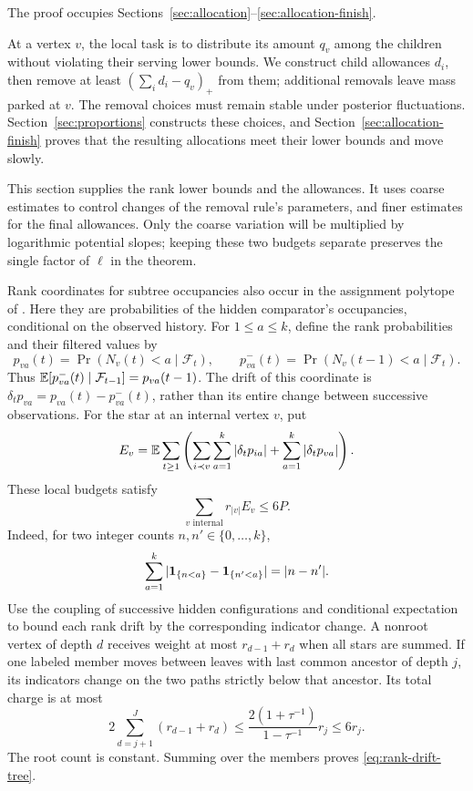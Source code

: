 The proof occupies Sections~\ref{sec:allocation}--\ref{sec:allocation-finish}.

At a vertex $v$, the local task is to distribute its amount $q_v$ among
the children without violating their serving lower bounds.  We construct
child allowances $d_i$, then remove at least $(\sum_i d_i-q_v)_+$ from
them; additional removals leave mass parked at $v$.  The removal choices
must remain stable under posterior fluctuations.  Section~\ref{sec:proportions}
constructs these choices, and Section~\ref{sec:allocation-finish} proves
that the resulting allocations meet their lower bounds and move slowly.

This section supplies the rank lower bounds and the allowances.  It uses
coarse estimates to control changes of the removal rule's parameters,
and finer estimates for the final allowances.  Only the coarse variation
will be multiplied by logarithmic potential slopes; keeping these two
budgets separate preserves the single factor of $\ell$ in the theorem.

Rank coordinates for subtree occupancies also occur in the assignment
polytope of \cite[Section~3.2]{BCLLM18}. Here they are probabilities of
the hidden comparator's occupancies, conditional on the observed history.
For $1\le a\le k$, define the rank probabilities and their filtered values by
\[
 p_{va}(t)=\Pr(N_v(t)<a\mid\mathcal F_t),\qquad
 p^-_{va}(t)=\Pr(N_v(t-1)<a\mid\mathcal F_t).
\]
Thus $\mathbb E[p^-_{va}(t)\mid\mathcal F_{t-1}]=p_{va}(t-1)$.
The drift of this coordinate is
$\delta_t p_{va}=p_{va}(t)-p^-_{va}(t)$, rather than its entire change
between successive observations.  For the star at an internal vertex $v$,
put
\begin{equation}\label{eq:star-drift}
 E_v=\mathbb E\sum_{t\ge1}\left(
        \sum_{i\prec v}\sum_{a=1}^k|\delta_t p_{ia}|
             +\sum_{a=1}^k|\delta_t p_{va}|\right).
\end{equation}
These local budgets satisfy
\begin{equation}\label{eq:rank-drift-tree}
             \sum_{v\text{ internal}}r_{|v|}E_v\le6P.
\end{equation}
Indeed, for two integer counts $n,n'\in\{0,\ldots,k\}$,
\[
 \sum_{a=1}^k|\mathbf 1_{\{n<a\}}-\mathbf 1_{\{n'<a\}}|=|n-n'|.
\]
Use the coupling of successive hidden configurations and conditional
expectation to bound each rank drift by the corresponding indicator
change.  A nonroot vertex of depth $d$ receives weight at most
$r_{d-1}+r_d$ when all stars are summed.  If one labeled member moves
between leaves with last common ancestor of depth $j$, its indicators
change on the two paths strictly below that ancestor.  Its total charge
is at most
\[
 2\sum_{d=j+1}^J(r_{d-1}+r_d)
 \le\frac{2(1+\tau^{-1})}{1-\tau^{-1}}r_j\le6r_j.
\]
The root count is constant.  Summing over the members proves
\eqref{eq:rank-drift-tree}.

